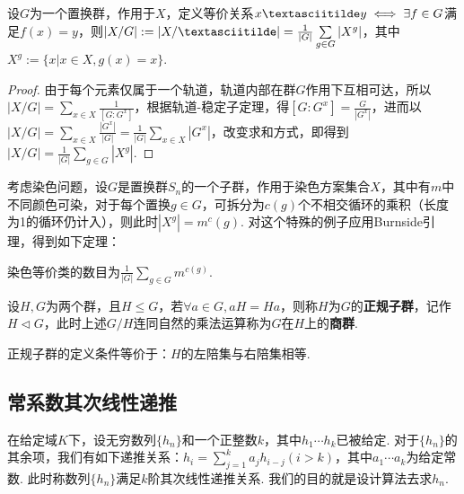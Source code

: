 \begin{lemma}[Burnside引理]
	设$G$为一个置换群，作用于$X$，定义等价关系$x\textasciitilde y\iff\exists f\in G$满足$f(x)=y$，则$|X/G|:=|X/\textasciitilde|=\frac{1}{|G|}\sum\limits_{g\in G}|X^g|$，其中$X^g:=\{x|x\in X,g(x)=x\}$.
\end{lemma}
\begin{proof}
	由于每个元素仅属于一个轨道，轨道内部在群$G$作用下互相可达，所以$|X/G|=\sum\limits_{x\in X}\frac{1}{[G:G^x]}$，根据轨道-稳定子定理，得$[G:G^x]=\frac{G}{|G^x|}$，进而以$|X/G|=\sum\limits_{x\in X}\frac{|G^x|}{|G|}=\frac{1}{|G|}\sum\limits_{x\in X}|G^x|$，改变求和方式，即得到$|X/G|=\frac{1}{|G|}\sum\limits_{g\in G}|X^g|$.
\end{proof}

考虑染色问题，设$G$是置换群$S_n$的一个子群，作用于染色方案集合$X$，其中有$m$中不同颜色可染，对于每个置换$g\in G$，可拆分为$c(g)$个不相交循环的乘积（长度为1的循环仍计入），则此时$|X^g|=m^c(g)$. 对这个特殊的例子应用Burnside引理，得到如下定理：
\begin{theorem}[Pólya定理]
	染色等价类的数目为$\frac{1}{|G|}\sum\limits_{g\in G}m^{c(g)}$.
\end{theorem}

设$H,G$为两个群，且$H\leqslant G$，若$\forall a\in G, aH=Ha$，则称$H$为$G$的\textbf{正规子群}，记作$H\lhd G$，此时上述$G/H$连同自然的乘法运算称为$G$在$H$上的\textbf{商群}.
\begin{remark}
	正规子群的定义条件等价于：$H$的左陪集与右陪集相等.
\end{remark}

\subsection{常系数其次线性递推}
\begin{problem}[常系数其次线性递推]
	在给定域$K$下，设无穷数列$\{h_n\}$和一个正整数$k$，其中$h_1\cdots h_k$已被给定. 对于$\{h_n\}$的其余项，我们有如下递推关系：$h_i=\sum\limits_{j=1}^k a_jh_{i-j}(i>k)$，其中$a_1\cdots a_k$为给定常数. 此时称数列$\{h_n\}$满足$k$阶其次线性递推关系. 我们的目的就是设计算法去求$h_n$. 
\end{problem}


